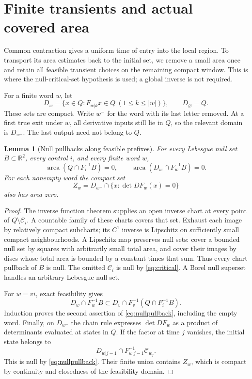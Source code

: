 \documentclass[11pt]{amsart}
\newtheorem{lemma}[theorem]{Lemma}
\theoremstyle{definition}
\theoremstyle{remark}
\newcommand{\R}{\mathbb R}
\newcommand{\area}{\operatorname{area}}
\numberwithin{equation}{section}
\begin{document}
\section{Finite transients and actual covered area}\label{sec:area}
Common contraction gives a uniform time of entry into the local region.
To transport its area estimates back to the initial set, we remove a
small area once and retain all feasible transient choices on the
remaining compact window. This is where the null-critical-set
hypothesis is used; a global inverse is not required.

For a finite word \(w\), let
\begin{equation}\label{eq:feasibledomains}
D_w=\{x\in Q:F_{w|k}x\in Q\ (1\le k\le|w|)\},
\qquad D_\varnothing=Q.
\end{equation}
These sets are compact. Write \(w^-\) for the word with its last
letter removed. At a first true exit under \(w\), all derivative
inputs still lie in \(Q\), so the relevant domain is \(D_{w^-}\).
The last output need not belong to \(Q\).

\begin{lemma}[Null pullbacks along feasible prefixes]\label{lem:nullpullback}
For every Lebesgue null set \(B\subset\R^2\), every control \(i\),
and every finite word \(w\),
\begin{equation}\label{eq:nullpullback}
\area(Q\cap F_i^{-1}B)=0,\qquad
\area(D_w\cap F_w^{-1}B)=0.
\end{equation}
For each nonempty word the compact set
\begin{equation}\label{eq:compositecritical}
Z_w=D_{w^-}\cap\{x:\det DF_w(x)=0\}
\end{equation}
also has area zero.
\end{lemma}
\begin{proof}
The inverse function theorem supplies an open inverse chart at
every point of \(Q\setminus\mathcal C_i\). A countable family of
these charts covers that set. Exhaust each image by relatively
compact subcharts; its \(C^1\) inverse is Lipschitz on sufficiently
small compact neighbourhoods. A Lipschitz map preserves null sets:
cover a bounded null set by squares with arbitrarily small total
area, and cover their images by discs whose total area is bounded
by a constant times that sum. Thus every chart pullback of \(B\)
is null. The omitted \(\mathcal C_i\) is null by
\eqref{eq:critical}. A Borel null superset handles an arbitrary
Lebesgue null set.

For \(w=vi\), exact feasibility gives
\[
D_w\cap F_w^{-1}B
\subset D_v\cap F_v^{-1}(Q\cap F_i^{-1}B).
\]
Induction proves the second assertion of \eqref{eq:nullpullback},
including the empty word.
Finally, on \(D_{w^-}\) the chain rule expresses \(\det DF_w\)
as a product of determinants evaluated at states in \(Q\).
If the factor at time \(j\) vanishes, the initial state belongs to
\[
D_{w|j-1}\cap F_{w|j-1}^{-1}\mathcal C_{w_j}.
\]
This is null by \eqref{eq:nullpullback}. Their finite union
contains \(Z_w\), which is compact by continuity and closedness
of the feasibility domain.
\end{proof}
\end{document}
